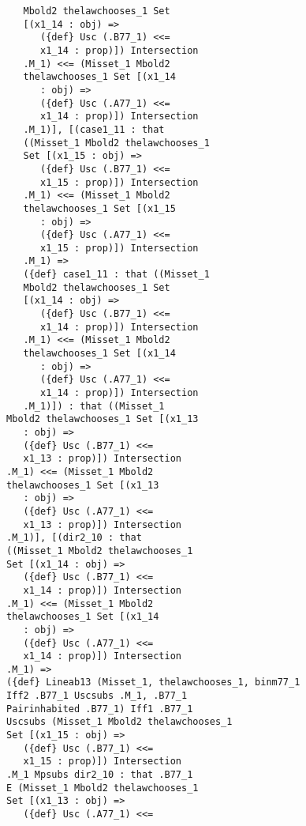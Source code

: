 \documentclass[12pt]{article}
\begin{document}
\begin{verbatim}
                Mbold2 thelawchooses_1 Set 
                [(x1_14 : obj) => 
                   ({def} Usc (.B77_1) <<= 
                   x1_14 : prop)]) Intersection 
                .M_1) <<= (Misset_1 Mbold2 
                thelawchooses_1 Set [(x1_14 
                   : obj) => 
                   ({def} Usc (.A77_1) <<= 
                   x1_14 : prop)]) Intersection 
                .M_1)], [(case1_11 : that 
                ((Misset_1 Mbold2 thelawchooses_1 
                Set [(x1_15 : obj) => 
                   ({def} Usc (.B77_1) <<= 
                   x1_15 : prop)]) Intersection 
                .M_1) <<= (Misset_1 Mbold2 
                thelawchooses_1 Set [(x1_15 
                   : obj) => 
                   ({def} Usc (.A77_1) <<= 
                   x1_15 : prop)]) Intersection 
                .M_1) => 
                ({def} case1_11 : that ((Misset_1 
                Mbold2 thelawchooses_1 Set 
                [(x1_14 : obj) => 
                   ({def} Usc (.B77_1) <<= 
                   x1_14 : prop)]) Intersection 
                .M_1) <<= (Misset_1 Mbold2 
                thelawchooses_1 Set [(x1_14 
                   : obj) => 
                   ({def} Usc (.A77_1) <<= 
                   x1_14 : prop)]) Intersection 
                .M_1)]) : that ((Misset_1 
             Mbold2 thelawchooses_1 Set [(x1_13 
                : obj) => 
                ({def} Usc (.B77_1) <<= 
                x1_13 : prop)]) Intersection 
             .M_1) <<= (Misset_1 Mbold2 
             thelawchooses_1 Set [(x1_13 
                : obj) => 
                ({def} Usc (.A77_1) <<= 
                x1_13 : prop)]) Intersection 
             .M_1)], [(dir2_10 : that 
             ((Misset_1 Mbold2 thelawchooses_1 
             Set [(x1_14 : obj) => 
                ({def} Usc (.B77_1) <<= 
                x1_14 : prop)]) Intersection 
             .M_1) <<= (Misset_1 Mbold2 
             thelawchooses_1 Set [(x1_14 
                : obj) => 
                ({def} Usc (.A77_1) <<= 
                x1_14 : prop)]) Intersection 
             .M_1) => 
             ({def} Lineab13 (Misset_1, thelawchooses_1, binm77_1 
             Iff2 .B77_1 Uscsubs .M_1, .B77_1 
             Pairinhabited .B77_1) Iff1 .B77_1 
             Uscsubs (Misset_1 Mbold2 thelawchooses_1 
             Set [(x1_15 : obj) => 
                ({def} Usc (.B77_1) <<= 
                x1_15 : prop)]) Intersection 
             .M_1 Mpsubs dir2_10 : that .B77_1 
             E (Misset_1 Mbold2 thelawchooses_1 
             Set [(x1_13 : obj) => 
                ({def} Usc (.A77_1) <<= 

\end{verbatim}
\end{document}
